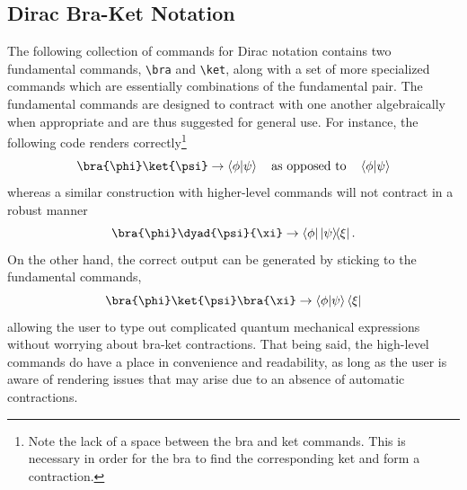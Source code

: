 \documentclass[a4paper,12pt]{article}
\begin{document}
\subsection{Dirac Bra-Ket Notation}
The following collection of commands for Dirac notation contains two fundamental commands, \verb|\bra| and \verb|\ket|, along with a set of more specialized commands which are essentially combinations of the fundamental pair. The fundamental commands are designed to contract with one another algebraically when appropriate and are thus suggested for general use. For instance, the following code renders correctly\footnote{Note the lack of a space between the bra and ket commands. This is necessary in order for the bra to find the corresponding ket and form a contraction.}
\begin{displaymath}
\verb|\bra{\phi}\ket{\psi}| \rightarrow \bra{\phi}\ket{\psi} \qq{as opposed to} \bra{\phi} \ket{\psi}
\end{displaymath}
whereas a similar construction with higher-level commands will not contract in a robust manner
\begin{displaymath}
\verb|\bra{\phi}\dyad{\psi}{\xi}| \rightarrow \bra{\phi}\dyad{\psi}{\xi}.
\end{displaymath}
On the other hand, the correct output can be generated by sticking to the fundamental commands,
\begin{displaymath}
\verb|\bra{\phi}\ket{\psi}\bra{\xi}| \rightarrow \bra{\phi}\ket{\psi}\bra{\xi}
\end{displaymath}
allowing the user to type out complicated quantum mechanical expressions without worrying about bra-ket contractions. That being said, the high-level commands do have a place in convenience and readability, as long as the user is aware of rendering issues that may arise due to an absence of automatic contractions.
\end{document}
